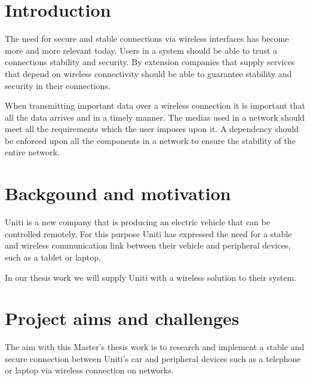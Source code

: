 \documentclass[a4paper]{article}
\begin{document}
\section{Introduction}
The need for secure and stable connections via wireless interfaces has become
more and more relevant today. Users in a system should be able to trust a
connections stability and security. By extension companies that supply services
that depend on wireless connectivity should be able to guarantee stability
and security in their connections.

When transmitting important data over a wireless connection it is important that all the data arrives and in a timely manner. The medias used in a network should meet all the requirements which the user imposes upon it. A dependency should be enforced upon all the components in a network to ensure the stability of the entire network.



\section{Backgound and motivation}
Uniti is a new company that is producing an electric vehicle that can be
controlled remotely. For this purpose Uniti has expressed the need for a stable and wireless communication link between their vehicle and peripheral devices, such as a tablet or laptop.

In our thesis work we will supply Uniti with a wireless solution to their system.




\section{Project aims and challenges}
The aim with this Master's thesis work is to research and implement a stable and
secure connection between Uniti's car and peripheral devices such as a telephone or
laptop via wireless connection on networks.
\end{document}
